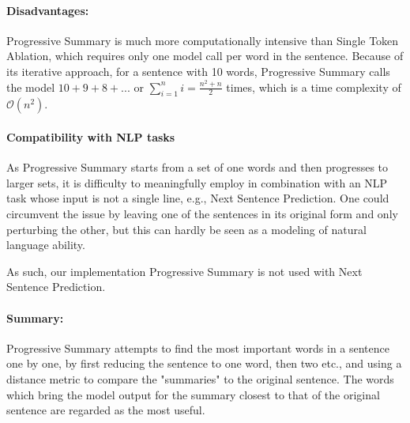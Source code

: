 \paragraph{Disadvantages:}
Progressive Summary is much more computationally intensive than Single Token Ablation, which requires only one model call per word in the sentence.
Because of its iterative approach, for a sentence with 10 words, Progressive Summary calls the model $10+9+8+... $ or $\sum_{i=1}^{n}i = \frac{n^2 + n}{2}$ times, which is a time complexity of $\mathcal{O}(n^2)$.


\paragraph{Compatibility with NLP tasks}
As Progressive Summary starts from a set of one words and then progresses to larger sets, it is difficulty to meaningfully employ in combination with an NLP task whose input is not a single line, e.g., Next Sentence Prediction.
One could circumvent the issue by leaving one of the sentences in its original form and only perturbing the other, but this can hardly be seen as a modeling of natural language ability.


As such, our implementation Progressive Summary is not used with Next Sentence Prediction.

\paragraph{Summary:}
Progressive Summary attempts to find the most important words in a sentence one by one, by first reducing the sentence to one word, then two etc., and using a distance metric to compare the "summaries" to the original sentence.
The words which bring the model output for the summary closest to that of the original sentence are regarded as the most useful.

